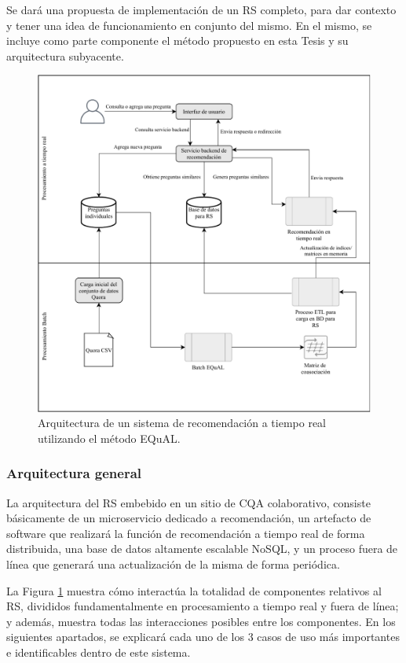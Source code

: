 \bigskip Se dará una propuesta de implementación de un RS completo, para dar contexto y tener una idea de funcionamiento en conjunto del mismo. En el mismo, se incluye como parte componente el método propuesto en esta Tesis y su arquitectura subyacente.

\bigskip
\begin{figure}[h!]
	\centering
	\includegraphics[width=0.9\linewidth]{8_problema_investigacion/imagenes/implementacion_rs}
	\caption{Arquitectura de un sistema de recomendación a tiempo real utilizando el método EQuAL.}
	\label{fig:implementacionrs}
\end{figure}

\subsubsection{Arquitectura general}
La arquitectura del RS embebido en un sitio de CQA colaborativo, consiste básicamente de un microservicio dedicado a recomendación, un artefacto de software que realizará la función de recomendación a tiempo real de forma distribuida, una base de datos altamente escalable NoSQL, y un proceso fuera de línea que generará una actualización de la misma de forma periódica.

La Figura \ref{fig:implementacionrs} muestra cómo interactúa la totalidad de componentes relativos al RS, divididos fundamentalmente en procesamiento a tiempo real y fuera de línea; y además, muestra todas las interacciones posibles entre los componentes. En los siguientes apartados, se explicará cada uno de los 3 casos de uso más importantes e identificables dentro de este sistema.

